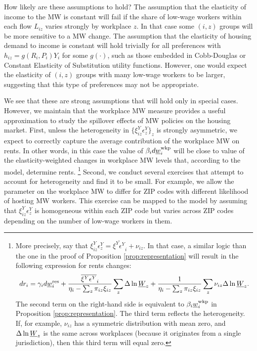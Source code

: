How likely are these assumptions to hold?
The assumption that the elasticity of income to the MW is constant will fail if 
the share of low-wage workers within each flow $L_{iz}$ varies strongly by 
workplace $z$.
In that case some $(i,z)$ groups will be more sensitive to a MW change.
The assumption that the elasticity of housing demand to income is constant 
will hold trivially for all preferences with
$h_{iz} = g\left(R_i, P_i\right) Y_i$ for some $g\left(\cdot\right)$, such as 
those embedded in Cobb-Douglas or Constant Elasticity of Substitution utility 
functions.
However, one would expect the elasticity of $(i,z)$ groups with many low-wage 
workers to be larger, suggesting that this type of preferences may not be 
appropriate.

We see that these are strong assumptions that will hold only in special cases.
However, we maintain that the workplace MW measure provides a useful 
approximation to study the spillover effects of MW policies on the housing 
market.
First, unless the heterogeneity in $\{\xi_{iz}^Y\epsilon_z^Y\}_z$ is strongly 
asymmetric, 
we expect to correctly capture the average contribution of the workplace MW on
rents.
In other words, in this case the value of $\beta_i  d \underline{w}^{\text{wkp}}_i$ will be 
close to value of the elasticity-weighted changes in workplace MW levels that, 
according to the model, determine rents.%
\footnote{More precisely, say that 
$\xi^Y_{iz}\epsilon_{z}^Y = \overline{\xi^Y\epsilon^Y}_i + \nu_{iz}$.
In that case, a similar logic than the one in the proof of 
Proposition \ref{prop:representation} will result in  the following expression 
for rents changes:
$$
    d r_i = \gamma_i d \underline{w}^{\text{res}}_i
          + \frac{\overline{\xi^Y\epsilon^Y}_i}
                 {\eta_{i} - \sum_z \pi_{iz} \xi_{iz}} \sum_z \Delta \ln \underline{W}_z
          + \frac{1}
                 {\eta_{i} - \sum_z \pi_{iz} \xi_{iz}} \sum_z \nu_{iz} \Delta \ln \underline{W}_z .
$$
The second term on the right-hand side is equivalent to $\beta_i \underline{w}_{i}^{\text{wkp}}$
in Proposition \ref{prop:representation}.
The third term reflects the heterogeneity.
If, for example, $\nu_{iz}$ has a symmetric distribution with mean zero, and
$\Delta \ln \underline{W}_z$ is the same across workplaces (because it originates from
a single jurisdiction), then this third term will equal zero.}
Second, we conduct several exercises that attempt to account for heterogeneity
and find it to be small.
For example, we allow the parameter on the workplace MW to differ for ZIP codes 
with different likelihood of hosting MW workers.
This exercise can be mapped to the model by assuming that 
$\xi^Y_{iz} \epsilon_z^Y$ is homogeneous within each ZIP code but varies
across ZIP codes depending on the number of low-wage workers in them.
